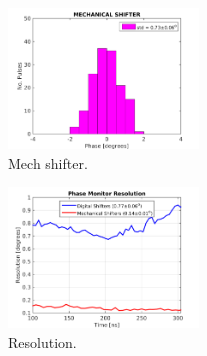 \begin{figure}
  \centering
  \includegraphics[width=0.45\textwidth]{Figures/PhMon_HistMech}
  \caption{Mech shifter.}
  \label{f:PhMon_HistMech}
\end{figure}


\begin{figure}
  \centering
  \includegraphics[width=0.45\textwidth]{Figures/PhMon_Resolution}
  \caption{Resolution.}
  \label{f:PhMon_Resolution}
\end{figure}











